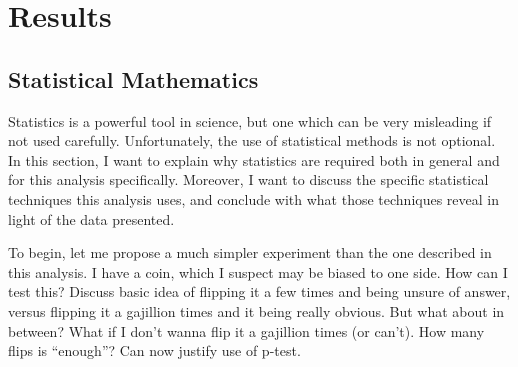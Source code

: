 \chapter{Results} \label{chapter:results}

%
%
%
%
%
%
%
%        
%
%

\section{Statistical Mathematics}

    Statistics is a powerful tool in science,
        but one which can be very misleading if not used carefully.
    Unfortunately, the use of statistical methods is not optional.
    In this section, I want to explain why statistics are required
        both in general and for this analysis specifically.
    Moreover, I want to discuss the specific statistical techniques this analysis uses,
        and conclude with what those techniques reveal in light of the data presented.

    To begin, let me propose a much simpler experiment than the one described in this analysis.
    I have a coin, which I suspect may be biased to one side.
    How can I test this?
    Discuss basic idea of flipping it a few times and being unsure of answer,
        versus flipping it a gajillion times and it being really obvious.
    But what about in between? What if I don't wanna flip it a gajillion times (or can't).
    How many flips is ``enough''?
    Can now justify use of p-test.

